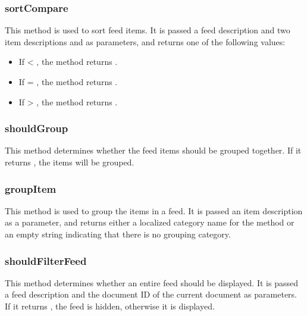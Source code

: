 \documentclass[letterpaper,12pt,english,openany,oneside]{sphinxmanual}
\begin{document}
\subsubsection{sortCompare}
\label{\detokenize{Tracker_InboxAPI:sortcompare}}
This method is used to sort feed items. It is passed a feed description and two item descriptions  and  as parameters, and returns one of the following values:
\begin{itemize}
\item {} 
If  < , the method returns .

\item {} 
If  = , the method returns .

\item {} 
If  > , the method returns .

\end{itemize}




\subsubsection{shouldGroup}
\label{\detokenize{Tracker_InboxAPI:shouldgroup}}
This method determines whether the feed items should be grouped together. If it returns , the items will be grouped.




\subsubsection{groupItem}
\label{\detokenize{Tracker_InboxAPI:groupitem}}
This method is used to group the items in a feed. It is passed an item description as a parameter, and returns either a localized category name for the method or an empty string indicating that there is no grouping category.




\subsubsection{shouldFilterFeed}
\label{\detokenize{Tracker_InboxAPI:shouldfilterfeed}}
This method determines whether an entire feed should be displayed. It is passed a feed description and the document ID of the current document as parameters. If it returns , the feed is hidden, otherwise it is displayed.
\end{document}
